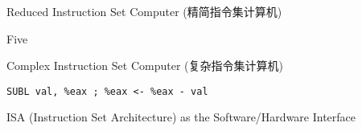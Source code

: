 

\begin{frame}{}
  \begin{center}
     Reduced Instruction Set Computer (精简指令集计算机)

    \vspace{0.80cm}
    \vspace{0.80cm}

     Five
  \end{center}
\end{frame}

\begin{frame}{}
  \begin{center}
     Complex Instruction Set Computer (复杂指令集计算机)

    \vspace{0.30cm}
    \vspace{0.30cm}

  \end{center}
\end{frame}

\begin{frame}{}
  \begin{center}
     \texttt{SUBL val, \%eax ; \qquad\%eax <- \%eax - val}

    \vspace{0.30cm}
    \vspace{0.30cm}
  \end{center}
\end{frame}

\begin{frame}{}
  \begin{center}
    ISA (Instruction Set Architecture) as the Software/Hardware Interface

    \pause
  \end{center}
\end{frame}

